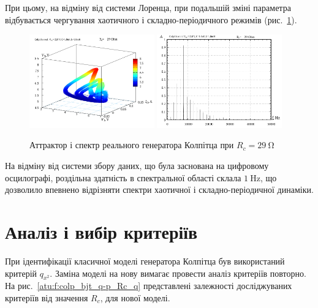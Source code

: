 При цьому, на відміну від системи Лоренца, при подальшій
зміні параметра відбувається чергування хаотичного і
складно-періодичного режимів (рис.~\ref{atu:f:colp_r_attr_f_29}).

\begin{figure}[htb!]
  \centerline{
    \includegraphics[width=0.48\textwidth]{p/r/v1iv2_029000.png}
    \hfill
    \includegraphics[width=0.48\textwidth]{p/r/f_029000.png}
  }
\caption{Аттрактор і спектр реального генератора Колпітца при $ R_c = \SI{29}{\ohm} $}
\label{atu:f:colp_r_attr_f_29}
\end{figure}

На відміну від системи збору даних, що була заснована на цифровому
осцилографі, роздільна здатність в спектральної області склала
$ \SI{1}{\hertz} $, що дозволило впевнено відрізняти спектри хаотичної
і складно-періодичної динаміки.


\section{Аналіз і вибір критеріїв}  %

При ідентифікації класичної моделі генератора Колпітца був
використаний критерій
$ q_{x^2} $. Заміна моделі на нову вимагає провести аналіз критеріїв
повторно. На рис.~\ref{atu:f:colp_bjt_q-p_Rc_q} представлені залежності
досліджуваних критеріїв від значення
$ R_c $, для нової моделі.

